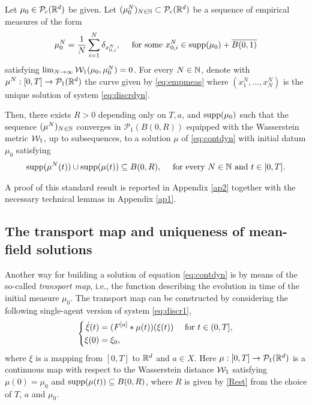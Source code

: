 
\begin{proposition}\label{pr:exist}
Let $\mu_0 \in \mathcal{P}_c(\mathbb{R}^d)$ be given. Let $(\mu^{N}_0)_{N \in \mathbb{N}} \subset \mathcal{P}_c(\mathbb{R}^d)$ be a sequence of empirical measures of the form
\begin{align*}
\mu^{N}_0 = \frac{1}{N}\sum^N_{i = 1} \delta_{x^{N}_{0,i}}, \quad \text{ for some } x^{N}_{0,i} \in \operatorname{supp}(\mu_0) + \overline{B(0,1)}
\end{align*}
satisfying $\lim_{N \rightarrow \infty} \mathcal{W}_1(\mu_0,\mu^{N}_0) = 0$. For every $N \in \mathbb{N}$, denote with $\mu^N:[0,T] \rightarrow \mathcal{P}_1(\mathbb{R}^{d})$ the curve given by \eqref{eq:empmeas} where $(x^N_1,\ldots,x^N_N)$ is the unique solution of system \eqref{eq:discrdyn}.

Then, there exists $R > 0$ depending only on $T,a$, and $\operatorname{supp}(\mu_0)$ such that the sequence $(\mu^N)_{N \in \mathbb{N}}$ converges in $\mathcal{P}_1(B(0,R))$ equipped with the Wasserstein metric $\mathcal{W}_1$, up to subsequences, to a solution $\mu$ of \eqref{eq:contdyn} with initial datum $\mu_0$ satisfying
\begin{align*}
\operatorname{supp}(\mu^N(t)) \cup \operatorname{supp}(\mu(t)) \subseteq B(0,R), \quad \text{ for every } N \in \mathbb{N} \text{ and } t \in [0,T].
\end{align*}
\end{proposition}

 A proof of this standard result is reported in Appendix \ref{ap2} together with the necessary technical lemmas in Appendix \ref{ap1}.

\subsection{The transport map and  uniqueness of mean-field solutions}

Another way for building a solution of equation \eqref{eq:contdyn} is by means of the so-called \textit{transport map}, i.e., the function describing the evolution in time of the initial measure $\mu_0$. The transport map can be constructed by considering the following single-agent version of system \eqref{eq:discr1},
\begin{align}\label{eq:transpdyn}
\left\{\begin{aligned}
\dot{\xi}(t) &= (F^{[a]}*\mu(t))(\xi(t)) \quad \text{ for } t \in (0,T],\\
\xi(0) &= \xi_0,
\end{aligned}\right.
\end{align}
where $\xi$ is a mapping from $[0,T]$ to $\mathbb{R}^d$ and $a \in X$. Here $\mu:[0,T]\rightarrow\mathcal{P}_1(\mathbb{R}^d)$ is a continuous map with respect to the Wasserstein distance $\mathcal{W}_1$ satisfying $\mu(0) = \mu_0$ and $\operatorname{supp}(\mu(t)) \subseteq B(0,R)$, where $R$ is given by \eqref{Rest} from the choice of $T$, $a$ and $\mu_0$. 

